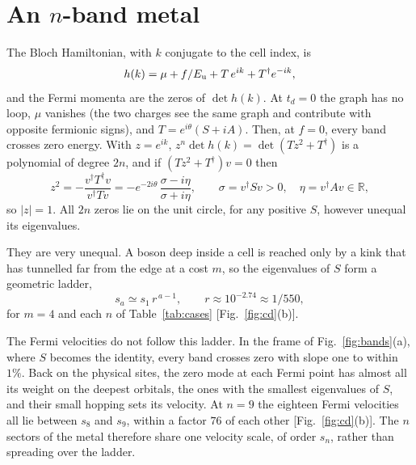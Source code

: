 \documentclass[11pt]{article}
\newcommand{\Eu}{E_{\rm u}}
\begin{document}
\section{An \texorpdfstring{$n$}{n}-band metal}\label{sec:metal}

The Bloch Hamiltonian, with $k$ conjugate to the cell index, is
\begin{equation}
h(k)=\mu+f/\Eu+T\,e^{ik}+T^\dagger e^{-ik},
\label{eq:bloch}
\end{equation}
and the Fermi momenta are the zeros of $\det h(k)$. At $t_d=0$ the graph has no loop, $\mu$ vanishes (the two charges see the same graph and contribute with opposite fermionic signs), and $T=e^{i\theta}(S+iA)$. Then, at $f=0$, every band crosses zero energy. With $z=e^{ik}$, $z^n\det h(k)=\det(Tz^2+T^\dagger)$ is a polynomial of degree $2n$, and if $(Tz^2+T^\dagger)v=0$ then
\begin{equation}
z^2=-\frac{v^\dagger T^\dagger v}{v^\dagger Tv}=-e^{-2i\theta}\,\frac{\sigma-i\eta}{\sigma+i\eta},\qquad \sigma=v^\dagger Sv>0,\quad \eta=v^\dagger Av\in\mathbb R,
\label{eq:unitcircle}
\end{equation}
so $|z|=1$. All $2n$ zeros lie on the unit circle, for any positive $S$, however unequal its eigenvalues.

They are very unequal. A boson deep inside a cell is reached only by a kink that has tunnelled far from the edge at a cost $m$, so the eigenvalues of $S$ form a geometric ladder,
\begin{equation}
s_a\simeq s_1\,r^{\,a-1},\qquad r\approx10^{-2.74}\approx1/550,
\label{eq:ladder}
\end{equation}
for $m=4$ and each $n$ of Table~\ref{tab:cases} [Fig.~\ref{fig:cd}(b)]. %

The Fermi velocities do not follow this ladder. In the frame of Fig.~\ref{fig:bands}(a), where $S$ becomes the identity, every band crosses zero with slope one to within $1\%$. Back on the physical sites, the zero mode at each Fermi point has almost all its weight on the deepest orbitals, the ones with the smallest eigenvalues of $S$, and their small hopping sets its velocity. At $n=9$ the eighteen Fermi velocities all lie between $s_8$ and $s_9$, within a factor $76$ of each other [Fig.~\ref{fig:cd}(b)]. The $n$ sectors of the metal therefore share one velocity scale, of order $s_n$, rather than spreading over the ladder. %
\end{document}
